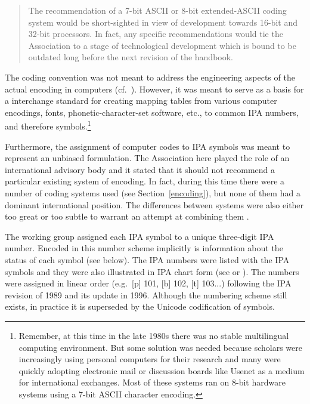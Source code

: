 \begin{quote}
The recommendation of a 7-bit ASCII or 8-bit extended-ASCII coding system 
would be short-sighted in view of development towards 16-bit and 32-bit 
processors. In fact, any specific recommendations would tie the Association 
to a stage of technological development which is bound to be outdated long 
before the next revision of the handbook.
\end{quote}

\noindent The coding convention was not meant to address the engineering 
aspects of the actual encoding in computers (cf.\ \cite{Anderson1984}). However, 
it was meant to serve as a basis for a interchange standard for 
creating mapping tables from various computer encodings, fonts, phonetic-character-set 
software, etc., to common IPA numbers, and therefore symbols.\footnote{Remember, at 
this time in the late 1980s there was no stable multilingual computing environment. 
But some solution was needed because scholars were increasingly using personal 
computers for their research and many were quickly adopting electronic mail or 
discussion boards like Usenet as a medium for international exchanges. 
Most of these systems ran on 8-bit hardware systems using a 7-bit ASCII character encoding.}

Furthermore, the assignment of computer codes to IPA symbols was meant to
represent an unbiased formulation. The Association here played the role of an
international advisory body and it stated that it should not recommend a
particular existing system of encoding. In fact, during this time there were a
number of coding systems used (see Section~\ref{encoding}), but none of them had
a dominant international position. The differences between systems were also
either too great or too subtle to warrant an attempt at combining them
\citep{International1989report}.

The working group assigned each IPA symbol to a unique three-digit IPA number. 
Encoded in this number scheme implicitly is information
about the status of each symbol (see below). The IPA numbers were listed with the
IPA symbols and they were also illustrated in IPA chart form (see
\cite[84]{EslingGaylord1993} or \cite[App. 2]{IPA1999}). The numbers were
assigned in linear order (e.g.\ [p] 101, [b] 102, [t] 103...) following the IPA
revision of 1989 and its update in 1996. Although the numbering scheme still 
exists, in practice it is superseded by the Unicode codification of symbols.

